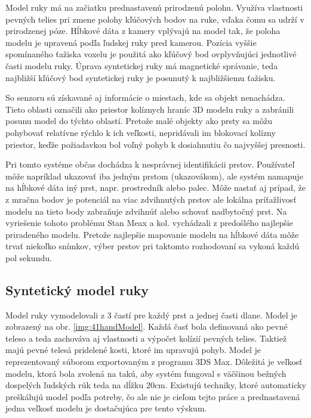 Model ruky má na začiatku prednastavenú prirodzenú polohu. Využíva vlastnosti pevných telies pri zmene polohy kľúčových bodov na ruke, vďaka čomu sa udrží v prirodzenej póze. Hĺbkové dáta z kamery vplývajú na model tak, že poloha modelu je upravená podľa ľudskej ruky pred kamerou. Pozícia vyššie spomínaného ťažiska voxelu je použitá ako kľúčový bod ovplyvňujúci jednotlivé časti modelu ruky. Úprava syntetickej ruky má magnetické správanie, teda najbližší kľúčový bod syntetickej ruky je posunutý k najbližšiemu ťažisku.

So senzoru sú získavané aj informácie o miestach, kde sa objekt nenachádza. Tieto oblasti označili ako priestor kolíznych hraníc 3D modelu ruky a zabránili posunu model do týchto oblastí. Pretože malé objekty ako prsty sa môžu pohybovať relatívne rýchlo k ich veľkosti, nepridávali im blokovací kolízny priestor, keďže požiadavkou bol voľný pohyb k dosiahnutiu čo najvyššej presnosti.

Pri tomto systéme občas dochádza k nesprávnej identifikácii prstov. Používateľ môže napríklad ukazovať iba jedným prstom (ukazovákom), ale systém namapuje na hĺbkové dáta iný prst, napr. prostredník alebo palec. Môže nastať aj prípad, že z mračna bodov je potenciál na viac zdvihnutých prstov ale lokálna príťažlivosť modelu na tieto body zabraňuje zdvihnúť alebo schovať nadbytočný prst. Na vyriešenie tohoto problému Stan Meax a kol. \cite{DBLP:journals/corr/MelaxKO17} vychádzali z predošlého najlepšie priradeného modelu. Pretože najlepšie mapovanie modelu na hĺbkové dáta môže trvať niekoľko snímkov, výber prstov pri taktomto rozhodovaní sa vykoná každú pol sekundu.

\subsection{Syntetický model ruky}
Model ruky vymodelovali z 3 častí pre každý prst a jednej časti dlane. Model je zobrazený na obr. \ref{img:41handModel}. Každá časť bola definovaná ako pevné teleso a teda zachováva aj vlastnosti a výpočet kolízií pevných telies. Taktiež majú pevné telesá pridelené kosti, ktoré im upravujú pohyb. Model je reprezentovaný súborom exportovaným z programu 3DS Max. Dôležitá je veľkosť modelu, ktorá bola zvolená na takú, aby systém fungoval s väčšinou bežných dospelých ľudských rúk teda na dĺžku 20cm. Existujú techniky, ktoré automaticky preškálujú model podľa potreby, čo ale nie je cieľom tejto práce a prednastavená jedna veľkosť modelu je dostačujúca pre tento výskum.

